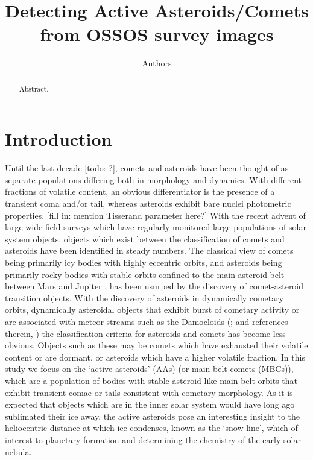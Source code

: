 \documentclass[iop,apj]{emulateapj}
\begin{document}
\title{Detecting Active Asteroids/Comets from OSSOS survey images}
\author{Authors}

\begin{abstract}
Abstract.
\end{abstract}

\maketitle

\section{Introduction}

Until the last decade [todo: ?], comets and asteroids have been thought of as separate populations differing both in morphology and dynamics. With different fractions of volatile content, an obvious differentiator is the presence of a transient coma and/or tail, whereas asteroids exhibit bare nuclei photometric properties. [fill in: mention Tisserand parameter here?]  With the recent advent of large wide-field surveys which have regularly monitored large populations of solar system objects, objects which exist between the classification of comets and asteroids have been identified in steady numbers. The classical view of comets being primarily icy bodies with highly eccentric orbits, and asteroids being primarily rocky bodies with stable orbits confined to the main asteroid belt between Mars and Jupiter \citep{sheppard15}, has been usurped by the discovery of comet-asteroid transition objects. With the discovery of asteroids in dynamically cometary orbits, dynamically asteroidal objects that exhibit burst of cometary activity or are associated with meteor streams such as the Damocloids (\cite{sonnett11}; and references therein, \cite{gilbert09}) the classification criteria for asteroids and comets has become less obvious. Objects such as these may be comets which have exhausted their volatile content or are dormant, or asteroids which have a higher volatile fraction. In this study we focus on the `active asteroids' (AAs) (or main belt comets (MBCs)), which are a population of bodies with stable asteroid-like main belt orbits that exhibit transient comae or tails consistent with cometary morphology.  As it is expected that objects which are in the inner solar system would have long ago sublimated their ice away, the active asteroids pose an interesting insight to the heliocentric distance at which ice condenses, known as the `snow line', which of interest to planetary formation and determining the chemistry of the early solar nebula.
\end{document}
